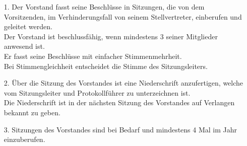 \documentclass{scrartcl}
\begin{document}
\begin{itemize}
	\item[1.] Der Vorstand fasst seine Beschlüsse in Sitzungen, die von dem
	          Vorsitzenden,
		      im Verhinderungsfall von seinem Stellvertreter, einberufen und geleitet
		      werden.\\
			  Der Vorstand ist beschlussfähig, wenn mindestens 3 seiner Mitglieder
			  anwesend ist.\\
			  Er fasst seine Beschlüsse mit einfacher Stimmenmehrheit.\\
			  Bei Stimmengleichheit entscheidet die Stimme des Sitzungsleiters.
	\item[2.] Über die Sitzung des Vorstandes ist eine Niederschrift anzufertigen,
	          welche vom Sitzungsleiter und Protokollführer zu unterzeichnen ist.\\
			  Die Niederschrift ist in der nächsten Sitzung des Vorstandes auf
			  Verlangen bekannt zu geben.
	\item[3.] Sitzungen des Vorstandes sind bei Bedarf und mindestens 4 Mal im
			  Jahr einzuberufen.\\
	

\end{itemize}
\end{document}
